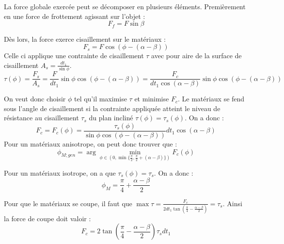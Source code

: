 \documentclass[../main.tex]{subfiles}
\begin{document}
La force globale exercée peut se décomposer en plusieurs éléments. Premièrement en une force de frottement agissant sur l'objet :\\
\begin{equation}
    F_f = F \sin{\beta}
\end{equation}

Dès lors, la force exerce cisaillement sur le matériaux : \\
\begin{equation}
    F_s = F\cos(\phi-(\alpha-\beta))
\end{equation}
Celle ci applique une contrainte de cisaillement $\tau$ avec pour aire de la surface de cisaillement $A_s = \frac{dt_1}{\sin{\phi}}$. \\

\begin{equation}
    \tau(\phi) = \frac{F_s}{A_s} = \frac{F}{dt_1} \sin{\phi} \cos(\phi-(\alpha-\beta)) = \frac{F_c}{dt_1 \cos(\alpha-\beta)}\sin{\phi} \cos(\phi-(\alpha-\beta))
\end{equation}

On veut donc choisir $\phi$ tel qu'il maximise $\tau$ et minimise $F_c$. Le matériaux se fend sous l'angle de cisaillement si la contrainte appliquée atteint le niveau de résistance au cisaillement $\tau_s$ du plan incliné $\tau(\phi) = \tau_s(\phi)$. On a donc :\\
\begin{equation}
    F_c = F_c(\phi) = \frac{\tau_s(\phi)}{\sin{\phi} \cos(\phi-(\alpha-\beta))}dt_1 \cos(\alpha-\beta)
\end{equation}
Pour un matériaux anisotrope, on peut donc trouver que : \\
\begin{equation}
    \phi_{M;gen} = \arg \min_{\phi\in (0, \min\{\frac{\pi}{2}, \frac{\pi}{2}+(\alpha-\beta)\})} F_c(\phi)
\end{equation}

Pour un matériaux isotrope, on a que $\tau_s(\phi) = \tau_s$. On a donc :\\
\begin{equation}
    \phi_M = \frac{\pi}{4}+\frac{\alpha-\beta}{2}
\end{equation}

Pour que le matériaux se coupe, il faut que $\max \tau = \frac{F_c}{2dt_1 \tan(\frac{\pi}{4}-\frac{\alpha-\beta}{2})} = \tau_s$. Ainsi la force de coupe doit valoir :\\
\begin{equation}
    F_c = 2\tan(\frac{\pi}{4}-\frac{\alpha-\beta}{2}) \tau_s dt_1
\end{equation}
\end{document}
